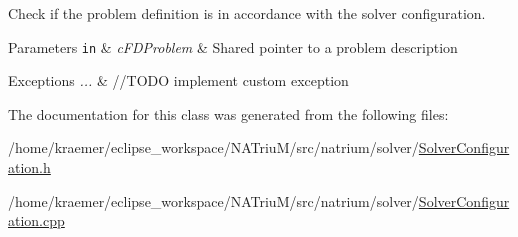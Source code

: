 Check if the problem definition is in accordance with the solver configuration. 


\begin{DoxyParams}[1]{Parameters}
\mbox{\tt in}  & {\em c\-F\-D\-Problem} & Shared pointer to a problem description\\
\hline
\end{DoxyParams}

\begin{DoxyExceptions}{Exceptions}
{\em ...} & //\-T\-O\-D\-O implement custom exception \\
\hline
\end{DoxyExceptions}


The documentation for this class was generated from the following files\-:\begin{DoxyCompactItemize}
\item 
/home/kraemer/eclipse\-\_\-workspace/\-N\-A\-Triu\-M/src/natrium/solver/\hyperlink{SolverConfiguration_8h}{Solver\-Configuration.\-h}\item 
/home/kraemer/eclipse\-\_\-workspace/\-N\-A\-Triu\-M/src/natrium/solver/\hyperlink{SolverConfiguration_8cpp}{Solver\-Configuration.\-cpp}\end{DoxyCompactItemize}
